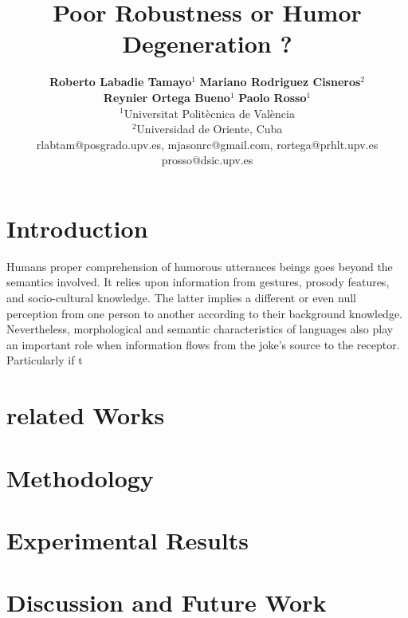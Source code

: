 \documentclass[a4paper,11pt,twocolumn,twoside]{article}
\title{Poor Robustness or Humor Degeneration ?}
\author {\textbf{Roberto Labadie Tamayo$^1$} \textbf{Mariano Rodriguez Cisneros$^2$} \\
 \textbf{Reynier Ortega  Bueno$^1$}  \textbf{Paolo Rosso$^1$}\\
$^1$Universitat Politècnica de València\\
$^2$Universidad de Oriente, Cuba\\
rlabtam@posgrado.upv.es, mjasonrc@gmail.com, rortega@prhlt.upv.es\\
prosso@dsic.upv.es\\
}
\begin{document}



\label{firstpage} \maketitle

\vspace{25mm}

\section{Introduction}



Humans proper comprehension of humorous utterances  beings goes beyond the semantics involved. It relies upon information from gestures, prosody features, and socio-cultural knowledge. The latter implies a different or even null perception from one person to another according to their background knowledge. Nevertheless, morphological and semantic characteristics of languages also play an important role when information flows from the joke's source to the receptor. Particularly if t

\section{related Works}

\section{Methodology}

\section{Experimental Results}

\section{Discussion and Future Work}



\end{document}
